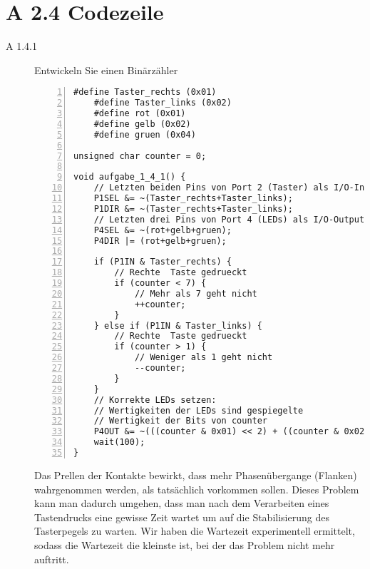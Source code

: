 \documentclass[11pt,a4paper,ngerman]{article}
\begin{document}
\newpage
\section*{A 2.4 Codezeile}
\begin{description}
\item[A 1.4.1] Entwickeln Sie einen Binärzähler \\

\begin{lstlisting}[numbers=left]
	#define Taster_rechts (0x01)
	#define Taster_links (0x02)
	#define rot (0x01)
	#define gelb (0x02)
	#define gruen (0x04)
	
unsigned char counter = 0;
	
void aufgabe_1_4_1() {
	// Letzten beiden Pins von Port 2 (Taster) als I/O-Input verwenden
	P1SEL &= ~(Taster_rechts+Taster_links);
	P1DIR &= ~(Taster_rechts+Taster_links);
	// Letzten drei Pins von Port 4 (LEDs) als I/O-Output verwenden
	P4SEL &= ~(rot+gelb+gruen);
	P4DIR |= (rot+gelb+gruen);
	
	if (P1IN & Taster_rechts) {
		// Rechte  Taste gedrueckt
		if (counter < 7) {
			// Mehr als 7 geht nicht
			++counter;
		}
	} else if (P1IN & Taster_links) {
		// Rechte  Taste gedrueckt
		if (counter > 1) {
			// Weniger als 1 geht nicht
			--counter;
		}
	}
	// Korrekte LEDs setzen:
	// Wertigkeiten der LEDs sind gespiegelte
	// Wertigkeit der Bits von counter
	P4OUT &= ~(((counter & 0x01) << 2) + ((counter & 0x02) << 1) + (counter & 0x04))
	wait(100);
}
\end{lstlisting}
Das Prellen der Kontakte bewirkt, dass mehr Phasenübergange (Flanken) wahrgenommen werden, als tatsächlich vorkommen sollen. Dieses Problem kann man dadurch umgehen, dass man nach dem Verarbeiten eines Tastendrucks eine gewisse Zeit wartet um auf die Stabilisierung des Tasterpegels zu warten. Wir haben die Wartezeit experimentell ermittelt, sodass die Wartezeit die kleinste ist, bei der das Problem nicht mehr auftritt.
\end{description}
\label{LastPage}
\end{document}
